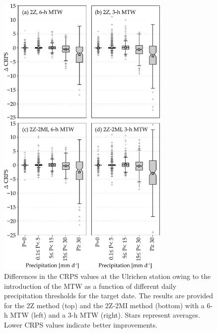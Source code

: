 \documentclass[hess, manuscript]{copernicus}
\begin{document}
	\begin{figure}[htb]
		\includegraphics[width=8.3cm]{fig11.pdf}
		\caption{Differences in the CRPS values at the Ulrichen station owing to the introduction of the MTW as a function of different daily precipitation thresholds for the target date. The results are provided for the 2Z method (top) and the 2Z-2MI method (bottom) with a 6-h MTW (left) and a 3-h MTW (right). Stars represent averages. Lower CRPS values indicate better improvements.}
		\label{fig:changes_CRPS_precip_threshold}
	\end{figure}
\end{document}
